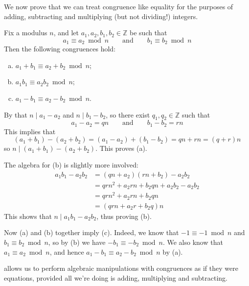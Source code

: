 We now prove that we can treat congruence like equality for the purposes of adding, subtracting and multiplying (but not dividing!) integers.

\begin{theorem}\label{thmModularArithmetic}
Fix a modulus $n$, and let $a_1,a_2,b_1,b_2 \in \mathbb{Z}$ be such that
\[ a_1 \equiv a_2 \bmod n \qquad \text{and} \qquad b_1 \equiv b_2 \bmod n \]
Then the following congruences hold:
\begin{enumerate}[(a)]
\item $a_1+b_1 \equiv a_2+b_2 \bmod n$;
\item $a_1b_1 \equiv a_2b_2 \bmod n$;
\item $a_1-b_1 \equiv a_2-b_2 \bmod n$.
\end{enumerate}
\end{theorem}
\begin{cproof} By  that $n \mid a_1-a_2$ and $n \mid b_1-b_2$, so there exist $q_1,q_2 \in \mathbb{Z}$ such that
\[ a_1-a_2 = qn \qquad \text{and} \qquad b_1-b_2=rn \]
This implies that
\[ (a_1+b_1)-(a_2+b_2) = (a_1-a_2)+(b_1-b_2) = qn+rn = (q+r)n \]
so $n \mid (a_1+b_1)-(a_2+b_2)$. This proves (a).

The algebra for (b) is slightly more involved:
\begin{align*}
a_1b_1-a_2b_2 &= (qn+a_2)(rn+b_2) - a_2b_2 \\
&= qrn^2 + a_2rn + b_2qn + a_2b_2 - a_2b_2 \\
&= qrn^2 + a_2rn + b_2qn \\
&= (qrn + a_2r + b_2q)n
\end{align*}
This shows that $n \mid a_1b_1 - a_2b_2$, thus proving (b).

Now (a) and (b) together imply (c). Indeed, we know that $-1 \equiv -1 \bmod n$ and $b_1 \equiv b_2 \bmod n$, so by (b) we have $-b_1 \equiv -b_2 \bmod n$. We also know that $a_1 \equiv a_2 \bmod n$, and hence $a_1-b_1 \equiv a_2-b_2 \bmod n$ by (a).
\end{cproof}

 allows us to perform algebraic manipulations with congruences as if they were equations, provided all we're doing is adding, multiplying and subtracting.

